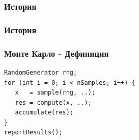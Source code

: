 \documentclass[serif,mathserif,14pt]{beamer}
\begin{document}
\begin{frame}
  \frametitle{История}
  \begin{figure}[t]
    \centering
  \end{figure}
\end{frame}
\begin{frame}
  \frametitle{История}
  \begin{figure}[t]
    \centering
  \end{figure}
\end{frame}

\begin{frame}[fragile]
\frametitle{Монте Карло - Дефиниция}
\pause
\begin{lstlisting}
RandomGenerator rng;
for (int i = 0; i < nSamples; i++) {
   x   = sample(rng, ..);
   res = compute(x, ..);
   accumulate(res);
}
reportResults();
\end{lstlisting}
\end{frame}
\end{document}
